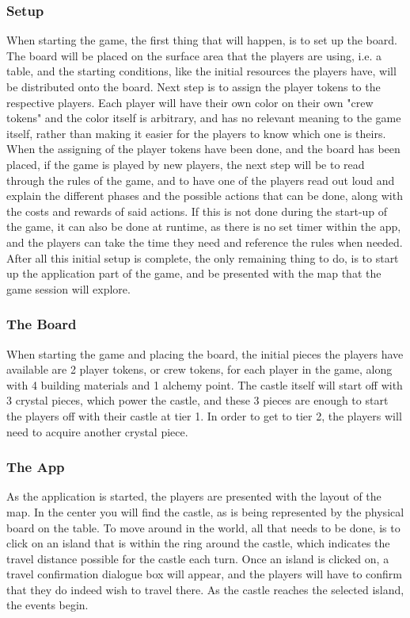 \subsubsection{Setup}

When starting the game, the first thing that will happen, is to set up the board. The board will be placed on the surface area that the players are using, i.e. a table, and the starting conditions, like the initial resources the players have, will be distributed onto the board. Next step is to assign the player tokens to the respective players. Each player will have their own color on their own "crew tokens" and the color itself is arbitrary, and has no relevant meaning to the game itself, rather than making it easier for the players to know which one is theirs.
When the assigning of the player tokens have been done, and the board has been placed, if the game is played by new players, the next step will be to read through the rules of the game, and to have one of the players read out loud and explain the different phases and the possible actions that can be done, along with the costs and rewards of said actions. If this is not done during the start-up of the game, it can also be done at runtime, as there is no set timer within the app, and the players can take the time they need and reference the rules when needed.
After all this initial setup is complete, the only remaining thing to do, is to start up the application part of the game, and be presented with the map that the game session will explore. 

\subsubsection{The Board}
When starting the game and placing the board, the initial pieces the players have available are 2 player tokens, or crew tokens, for each player in the game, along with 4 building materials and 1 alchemy point. The castle itself will start off with 3 crystal pieces, which power the castle, and these 3 pieces are enough to start the players off with their castle at tier 1. In order to get to tier 2, the players will need to acquire another crystal piece.


\subsubsection{The App}
As the application is started, the players are presented with the layout of the map. In the center you will find the castle, as is being represented by the physical board on the table. To move around in the world, all that needs to be done, is to click on an island that is within the ring around the castle, which indicates the travel distance possible for the castle each turn. Once an island is clicked on, a travel confirmation dialogue box will appear, and the players will have to confirm that they do indeed wish to travel there. As the castle reaches the selected island, the events begin. 


